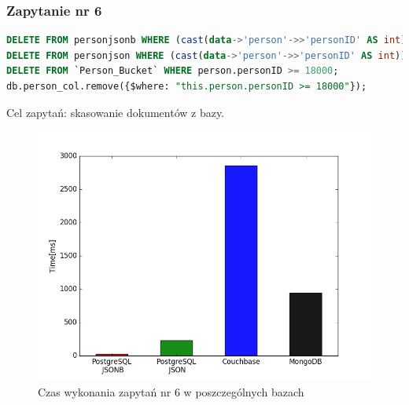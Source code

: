 \documentclass[a4paper,12pt,table]{article}
\begin{document}
{\subsubsection{Zapytanie nr 6}

\begin{lstlisting}[language=SQL,basicstyle=\footnotesize]
DELETE FROM personjsonb WHERE (cast(data->'person'->>'personID' AS int))>=18000;
DELETE FROM personjson WHERE (cast(data->'person'->>'personID' AS int))>=18000;
DELETE FROM `Person_Bucket` WHERE person.personID >= 18000;
db.person_col.remove({$where: "this.person.personID >= 18000"});
\end{lstlisting}
\vspace{0.5cm}
Cel zapytań: skasowanie dokumentów z bazy.
\begin{figure}[h]
\begin{center}
\includegraphics[scale=0.5]{ax/fig6}
\end{center}
\caption{Czas wykonania zapytań nr 6 w poszczególnych bazach}
\end{figure}

}
\end{document}
